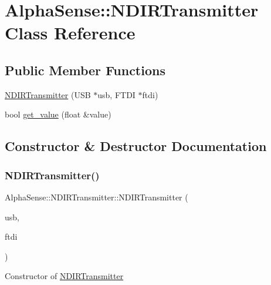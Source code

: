 \hypertarget{classAlphaSense_1_1NDIRTransmitter}{}\section{Alpha\+Sense\+:\+:N\+D\+I\+R\+Transmitter Class Reference}
\label{classAlphaSense_1_1NDIRTransmitter}
\subsection*{Public Member Functions}
\begin{DoxyCompactItemize}
\item 
\hyperlink{classAlphaSense_1_1NDIRTransmitter_ab0cc5c8bc46fa2540c14c243bdc365f4}{N\+D\+I\+R\+Transmitter} (U\+SB $\ast$usb, F\+T\+DI $\ast$ftdi)
\item 
bool \hyperlink{classAlphaSense_1_1NDIRTransmitter_af9d424a5d3f781717018a789414ae263}{get\+\_\+value} (float \&value)
\end{DoxyCompactItemize}


\subsection{Constructor \& Destructor Documentation}
\mbox{\label{classAlphaSense_1_1NDIRTransmitter_ab0cc5c8bc46fa2540c14c243bdc365f4}} 
\subsubsection{\texorpdfstring{N\+D\+I\+R\+Transmitter()}{NDIRTransmitter()}}
{\footnotesize\ttfamily Alpha\+Sense\+::\+N\+D\+I\+R\+Transmitter\+::\+N\+D\+I\+R\+Transmitter (\begin{DoxyParamCaption}\item[{U\+SB $\ast$}]{usb,  }\item[{F\+T\+DI $\ast$}]{ftdi }\end{DoxyParamCaption})\hspace{0.3cm}{\ttfamily [inline]}}

Constructor of \hyperlink{classAlphaSense_1_1NDIRTransmitter}{N\+D\+I\+R\+Transmitter}

